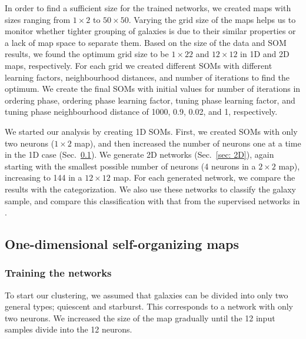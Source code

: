     In order to find a sufficient size for the trained networks, we created maps with sizes ranging from $1\times2$ to $50\times50$.
    Varying the grid size of the maps helps us to monitor whether tighter grouping of galaxies is due to their similar properties or a lack of map space to separate them.
   Based on the size of the data and SOM results, we found the optimum grid size to be $1\times22$ and $12\times12$ in 1D and 2D maps, respectively. 
    For each grid we created different SOMs with different learning factors, neighbourhood distances, and number of iterations to find the optimum.
    We create the final SOMs with initial values for number of iterations in ordering phase, ordering phase learning factor, tuning phase learning factor, and tuning phase neighbourhood distance of 1000, 0.9, 0.02, and 1, respectively.
   
    We started our analysis by creating 1D SOMs. 
    First, we created SOMs with only two neurons ($1\times2$ map), and then increased the number of neurons one at a time in the 1D case (Sec.~\ref{sec: 1D}).
    We generate 2D networks (Sec.~\ref{sec: 2D}),  again starting with the smallest possible number of neurons (4 neurons in a $2\times2$ map), increasing to 144 in a $12\times12$ map.    
    For each generated network, we compare the results with the  categorization.
    We also use these networks to classify the  galaxy sample, and compare this classification with that from the supervised networks in .

    \subsection{One-dimensional self-organizing maps}
    \label{sec: 1D}
        \subsubsection{Training the networks}
        \label{sec: 1Dt}
            To start our clustering, we assumed that galaxies can be divided into only two general types; quiescent and starburst.
            This corresponds to a network with only two neurons.
            We increased the size of the map gradually until the 12 input samples divide into the 12 neurons. 
        
